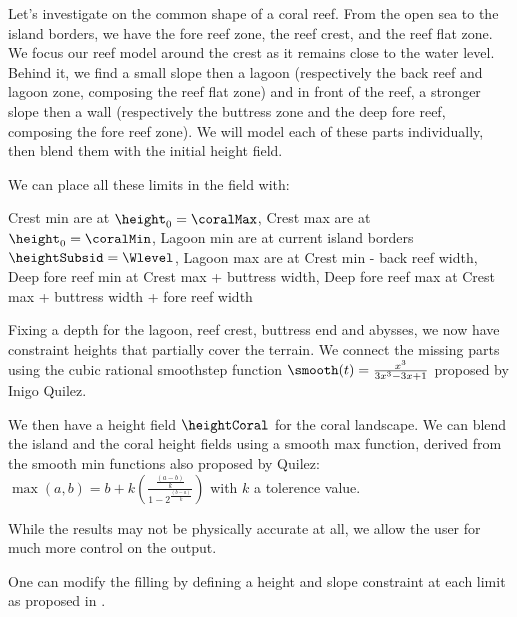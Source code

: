 Let's investigate on the common shape of a coral reef. From the open sea to the island borders, we have the fore reef zone, the reef crest, and the reef flat zone. We focus our reef model around the crest as it remains close to the water level. Behind it, we find a small slope then a lagoon (respectively the back reef and lagoon zone, composing the reef flat zone) and in front of the reef, a stronger slope then a wall (respectively the buttress zone and the deep fore reef, composing the fore reef zone). We will model each of these parts individually, then blend them with the initial height field.

We can place all these limits in the field with:
\begin{Itemize}
    \Item{} Crest min are at $\height_0 = \coralMax$,
    \Item{} Crest max are at $\height_0 = \coralMin$,
    \Item{} Lagoon min are at current island borders $\heightSubsid = \Wlevel$,
    \Item{} Lagoon max are at Crest min - back reef width,
    \Item{} Deep fore reef min at Crest max + buttress width,
    \Item{} Deep fore reef max at Crest max + buttress width + fore reef width
\end{Itemize}

Fixing a depth for the lagoon, reef crest, buttress end and abysses, we now have constraint heights that partially cover the terrain. We connect the missing parts using the cubic rational smoothstep function $\smooth(t) = \frac{x^3}{3x^3 - 3x + 1}$ proposed by Inigo Quilez.

We then have a height field $\heightCoral$ for the coral landscape. We can blend the island and the coral height fields using a smooth max function, derived from the smooth min functions also proposed by Quilez: $\max(a, b) = b + k \left( \frac{\frac{\left( a-b \right)}{k}}{1-2^{\frac{\left( b - a  \right)}{k}}} \right)$ with $k$ a tolerence value. 


While the results may not be physically accurate at all, we allow the user for much more control on the output.

One can modify the filling by defining a height and slope constraint at each limit as proposed in \citep{Guerin2022}.


